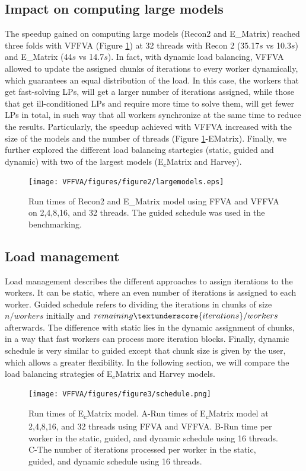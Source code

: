 \subsection{Impact on computing large models}
The speedup gained on computing large models (Recon2 and E\_Matrix) reached three folds with VFFVA (Figure \ref{fig:largemodel.}) at 32 threads with Recon 2 (35.17$s$ vs 10.3$s$) and E\_Matrix (44$s$ vs 14.7$s$). In fact, with dynamic load balancing, VFFVA allowed to update the assigned chunks of iterations to every worker dynamically, which guarantees an equal distribution of the load. In this case, the workers that get fast-solving LPs, will get a larger number of iterations assigned, while those that get ill-conditioned LPs and require more time to solve them, will get fewer LPs in total, in such way that all workers synchronize at the same time to reduce the results. Particularly, the speedup achieved with VFFVA increased with the size of the models and the number of threads (Figure \ref{fig:largemodel.}-E\textunderscore Matrix). 
Finally, we further explored the different load balancing startegies (static, guided and dynamic) with two of the largest models (E\textsubscript{c}\textunderscore Matrix and Harvey).
\begin{figure}[!htp]
\centering
\texttt{[image: VFFVA/figures/figure2/largemodels.eps]}
\caption[Run times of Recon2 and E\textunderscore Matrix model.]{Run times of Recon2 and E\_Matrix model using FFVA and VFFVA on 2,4,8,16, and 32 threads. The guided schedule was used in the benchmarking.}
\label{fig:largemodel.}
\end{figure}
\subsection{Load management}
Load management describes the different approaches to assign iterations to the workers. It can be static, where an even number of iterations is assigned to each worker. Guided schedule refers to dividing the iterations in chunks of size $n/workers$ initially and $remaining\textunderscore{iterations}/workers$ afterwards. The difference with static lies in the dynamic assignment of chunks, in a way that fast workers can process more iteration blocks. Finally, dynamic schedule is very similar to guided except that chunk size is given by the user, which allows a greater flexibility. In the following section, we will compare the load balancing strategies of E\textsubscript{c}\textunderscore Matrix and Harvey models.\\
\begin{figure}[!htp]
\centering
\texttt{[image: VFFVA/figures/figure3/schedule.png]}
\caption[Run times of E\textsubscript{c}\textunderscore Matrix model.]{Run times of E\textsubscript{c}\textunderscore Matrix model. A-Run times of E\textsubscript{c}\textunderscore Matrix model at 2,4,8,16, and 32 threads using FFVA and VFFVA. B-Run time per worker in the static, guided, and dynamic schedule using 16 threads. C-The number of iterations processed per worker in the static, guided, and dynamic schedule using 16 threads.}
\label{fig:static.}
\end{figure}
